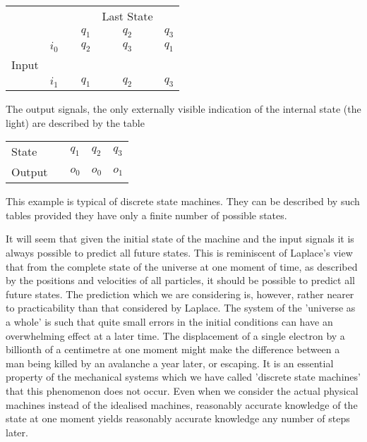 \documentclass[12pt]{article}
\begin{document}
    \begin{table}[h!]
        \centering
        \begin{tabular}{cccccc}
              &       &                       &       & Last State &                            \\
              &       &                       & $q_1$ & $q_2$      & $q_3$                      \\ \cline{4-6} 
              & $i_0$ & \multicolumn{1}{c|}{} & $q_2$ & $q_3$      & \multicolumn{1}{c|}{$q_1$} \\
        Input &       & \multicolumn{1}{c|}{} &       &            & \multicolumn{1}{c|}{}      \\
              & $i_1$ & \multicolumn{1}{c|}{} & $q_1$ & $q_2$      & \multicolumn{1}{c|}{$q_3$} \\ \cline{4-6} 
        \end{tabular}
    \end{table}
    
    \noindent
    The output signals, the only externally visible indication of the internal state (the light) are described by the table

    \begin{table}[h!]
        \centering
        \begin{tabular}{lllll}
        State  &  & $q_1$ & $q_2$ & $q_3$ \\
        Output &  & $o_0$ & $o_0$ & $o_1$
        \end{tabular}
    \end{table}

    \noindent
    This example is typical of discrete state machines. They can be described by such tables provided they have only a finite number of possible states.

    It will seem that given the initial state of the machine and the input signals it is always possible to predict all future states. This is reminiscent of Laplace's view that from the complete state of the universe at one moment of time, as described by the positions and velocities of all particles, it should be possible to predict all future states. The prediction which we are considering is, however, rather nearer to practicability than that considered by Laplace. The system of the 'universe as a whole' is such that quite small errors in the initial conditions can have an overwhelming effect at a later time. The displacement of a single electron by a billionth of a centimetre at one moment might make the difference between a man being killed by an avalanche a year later, or escaping. It is an essential property of the mechanical systems which we have called 'discrete state machines' that this phenomenon does not occur. Even when we consider the actual physical machines instead of the idealised machines, reasonably accurate knowledge of the state at one moment yields reasonably accurate knowledge any number of steps later.
\end{document}
